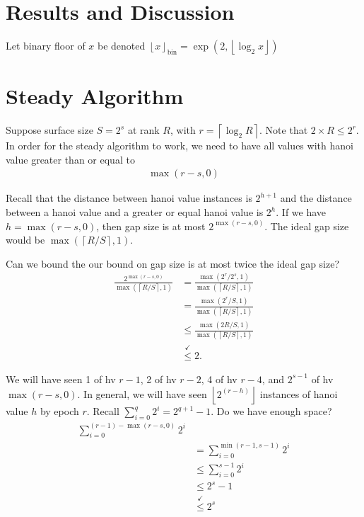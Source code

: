 \section{Results and Discussion} \label{sec:results}

Let binary floor of $x$ be denoted $\left\lfloor x \right\rfloor_\mathrm{bin} = \exp(2, \left\lfloor \log_2 x \right\rfloor)$

\section{Steady Algorithm}

Suppose surface size $S = 2^s$ at rank $R$, with $r = \left\lceil \log_2 R \right\rceil$.
Note that $2 \times R \leq 2^r$.
In order for the steady algorithm to work, we need to have all values with hanoi value greater than or equal to
\begin{align*}
\max(r - s, 0)
\end{align*}

Recall that the distance between hanoi value instances is $2^{h + 1}$ and the distance between a hanoi value and a greater or equal hanoi value is $2^h$.
If we have $h = \max (r - s, 0)$, then gap size is at most $2^{\max(r - s, 0)}$.
The ideal gap size would be $\max( \left\lceil R / S \right\rceil, 1)$.

Can we bound the our bound on gap size is at most twice the ideal gap size?
\begin{align*}
\frac{
  2^{\max(r - s, 0)}
}{
  \max(\left\lceil R / S \right\rceil, 1)
}
&=
\frac{
  \max(2^r / 2^s, 1)
}{
  \max(\left\lceil R / S \right\rceil, 1)
} \\
&=
\frac{
  \max(2^r / S, 1)
}{
  \max(\left\lceil R / S \right\rceil, 1)
} \\
&\leq
\frac{
  \max(2R / S, 1)
}{
  \max(\left\lceil R / S \right\rceil, 1)
} \\
&\stackrel{\checkmark}{\leq} 2.
\end{align*}

We will have seen 1 of hv $r - 1$, 2 of hv $r - 2$, 4 of hv $r - 4$, and $2 ^ {s - 1}$ of hv $\max(r - s, 0)$.
In general, we will have seen $\left\lfloor 2 ^ (r - h) \right\rfloor$ instances of hanoi value $h$ by epoch $r$.
Recall $\sum_{i = 0}^{q} 2^i = 2 ^ {q + 1} - 1$.
Do we have enough space?
\begin{align*}
\sum_{i = 0}^{(r - 1) - \max(r - s, 0)} 2 ^ i \\
&= \sum_{i = 0}^{\min(r - 1, s - 1)} 2 ^ i \\
&\leq \sum_{i = 0}^{s - 1} 2 ^ i \\
&\leq 2^s - 1\\
&\stackrel{\checkmark}{\leq} 2^s
\end{align*}

